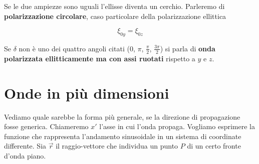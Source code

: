 Se le due ampiezze sono uguali l'ellisse diventa un cerchio. Parleremo di \textbf{polarizzazione circolare}, caso particolare della polarizzazione ellittica

\[
	\xi_{0y} = \xi_{0z}
\]

Se $\delta$ non è uno dei quattro angoli citati ($0$, $ \pi  $, $ \frac{\pi}{2} $, $ \frac{3\pi}{2} $) si parla di \textbf{onda polarizzata ellitticamente ma con assi ruotati} rispetto a $y$ e $z$.

\section{Onde in più dimensioni}

Vediamo quale sarebbe la forma più generale, se la direzione di propagazione fosse generica. Chiameremo $x'$ l'asse in cui l'onda propaga. Vogliamo esprimere la funzione che rappresenta l'andamento sinusoidale in un sistema di coordinate differente. Sia $\vec{r}$ il raggio-vettore che individua un punto $P$ di un certo fronte d'onda piano.

